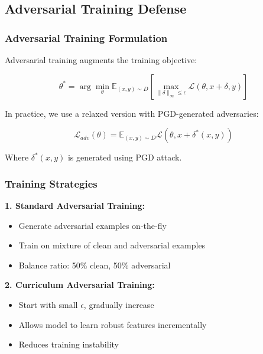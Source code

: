 \documentclass[conference]{IEEEtran}
\begin{document}
\subsection{Adversarial Training Defense}
\label{sec:q4_adversarial_training}

\subsubsection{Adversarial Training Formulation}
\label{sec:q4_adv_training_math}

Adversarial training augments the training objective:

\begin{equation}
\theta^* = \arg\min_\theta \mathbb{E}_{(x,y) \sim D} [\max_{\|\delta\|_\infty \leq \epsilon} \mathcal{L}(\theta, x + \delta, y)]
\end{equation}

In practice, we use a relaxed version with PGD-generated adversaries:

\begin{equation}
\mathcal{L}_{adv}(\theta) = \mathbb{E}_{(x,y) \sim D} \mathcal{L}(\theta, x + \delta^*(x,y))
\end{equation}

Where $\delta^*(x,y)$ is generated using PGD attack.

\subsubsection{Training Strategies}
\label{sec:q4_training_strategies}

\textbf{1. Standard Adversarial Training:}
\begin{itemize}
  \item Generate adversarial examples on-the-fly
  \item Train on mixture of clean and adversarial examples
  \item Balance ratio: 50\% clean, 50\% adversarial
\end{itemize}

\textbf{2. Curriculum Adversarial Training:}
\begin{itemize}
  \item Start with small $\epsilon$, gradually increase
  \item Allows model to learn robust features incrementally
  \item Reduces training instability
\end{itemize}
\end{document}
